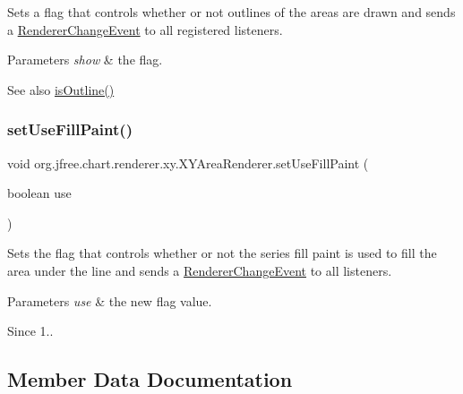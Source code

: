 Sets a flag that controls whether or not outlines of the areas are drawn and sends a \mbox{\hyperlink{}{Renderer\+Change\+Event}} to all registered listeners.


\begin{DoxyParams}{Parameters}
{\em show} & the flag.\\
\hline
\end{DoxyParams}
\begin{DoxySeeAlso}{See also}
\mbox{\hyperlink{classorg_1_1jfree_1_1chart_1_1renderer_1_1xy_1_1_x_y_area_renderer_ac3cc19d734e12c87eca22360c0d1eeea}{is\+Outline()}} 
\end{DoxySeeAlso}
\mbox{\label{classorg_1_1jfree_1_1chart_1_1renderer_1_1xy_1_1_x_y_area_renderer_a603c02d3902bb665ff165a9281c130bc}} 
\subsubsection{\texorpdfstring{set\+Use\+Fill\+Paint()}{setUseFillPaint()}}
{\footnotesize\ttfamily void org.\+jfree.\+chart.\+renderer.\+xy.\+X\+Y\+Area\+Renderer.\+set\+Use\+Fill\+Paint (\begin{DoxyParamCaption}\item[{boolean}]{use }\end{DoxyParamCaption})}

Sets the flag that controls whether or not the series fill paint is used to fill the area under the line and sends a \mbox{\hyperlink{}{Renderer\+Change\+Event}} to all listeners.


\begin{DoxyParams}{Parameters}
{\em use} & the new flag value.\\
\hline
\end{DoxyParams}
\begin{DoxySince}{Since}
1.. 
\end{DoxySince}


\subsection{Member Data Documentation}
\mbox{\label{classorg_1_1jfree_1_1chart_1_1renderer_1_1xy_1_1_x_y_area_renderer_af38665c90662e49e8a30ad2be5a8f8d8}} 
